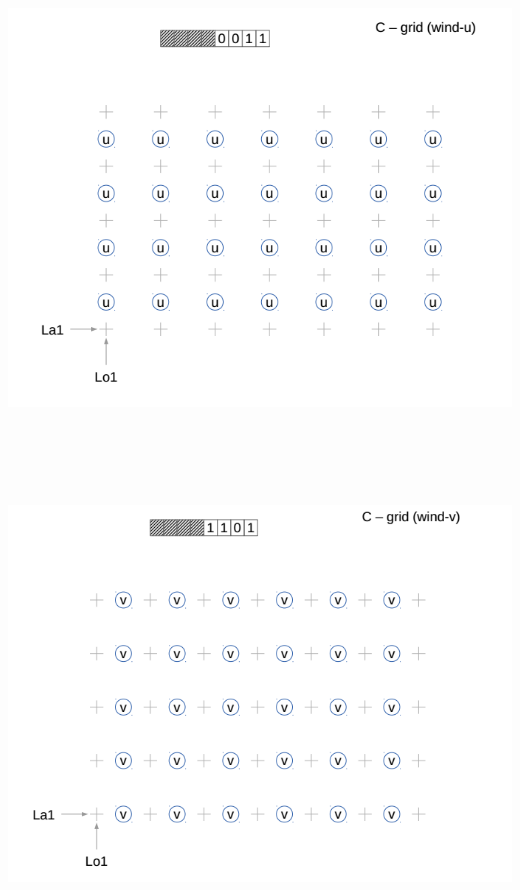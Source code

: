 {}\includegraphics[width=6.49931in,height=5.15694in]{../tex/extracted-media/media/image7.png}\includegraphics[width=6.49931in,height=4.87153in]{../tex/extracted-media/media/image8.png}\textbf{\\
}
